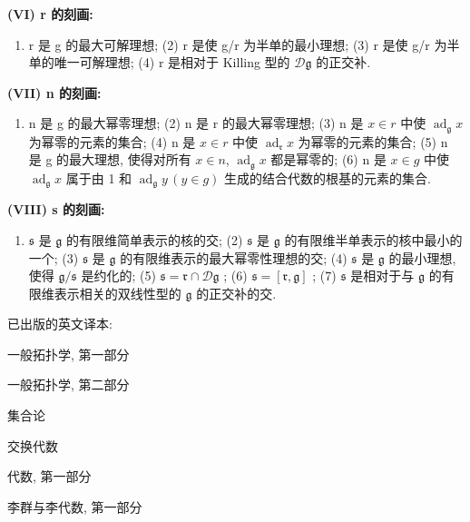 \textbf{(VI) r 的刻画:}

\begin{enumerate}
\def\labelenumi{(\arabic{enumi})}
\tightlist
\item
  r 是 g 的最大可解理想; (2) r 是使 g/r 为半单的最小理想; (3) r 是使 g/r 为半单的唯一可解理想; (4) r 是相对于 Killing 型的 \(\mathcal{D}\mathfrak{g}\) 的正交补.
\end{enumerate}

\textbf{(VII) n 的刻画:}

\begin{enumerate}
\def\labelenumi{(\arabic{enumi})}
\tightlist
\item
  n 是 g 的最大幂零理想; (2) n 是 r 的最大幂零理想; (3) n 是 \(x \in r\) 中使 \(\operatorname{ad}_{\mathfrak{g}} x\) 为幂零的元素的集合; (4) n 是 \(x \in r\) 中使 \(\operatorname{ad}_{\mathfrak{r}} x\) 为幂零的元素的集合; (5) n 是 g 的最大理想, 使得对所有 \(x \in n\), \(\operatorname{ad}_{\mathfrak{g}} x\) 都是幂零的; (6) n 是 \(x \in g\) 中使 \(\operatorname{ad}_{\mathfrak{g}} x\) 属于由 1 和 \(\operatorname{ad}_{\mathfrak{g}} y\,(y \in g)\) 生成的结合代数的根基的元素的集合.
\end{enumerate}

\textbf{(VIII) s 的刻画:}

\begin{enumerate}
\def\labelenumi{(\arabic{enumi})}
\tightlist
\item
  \(\mathfrak{s}\) 是 \(\mathfrak{g}\) 的有限维简单表示的核的交; (2) \(\mathfrak{s}\) 是 \(\mathfrak{g}\) 的有限维半单表示的核中最小的一个; (3) \(\mathfrak{s}\) 是 \(\mathfrak{g}\) 的有限维表示的最大幂零性理想的交; (4) \(\mathfrak{s}\) 是 \(\mathfrak{g}\) 的最小理想, 使得 \(\mathfrak{g} / \mathfrak{s}\) 是约化的; (5) \(\mathfrak{s} = \mathfrak{r} \cap \mathcal{D}\mathfrak{g}\) ; (6) \(\mathfrak{s} = [\mathfrak{r}, \mathfrak{g}]\) ; (7) \(\mathfrak{s}\) 是相对于与 \(\mathfrak{g}\) 的有限维表示相关的双线性型的 \(\mathfrak{g}\) 的正交补的交.
\end{enumerate}



已出版的英文译本:

一般拓扑学, 第一部分

一般拓扑学, 第二部分

集合论

交换代数

代数, 第一部分

李群与李代数, 第一部分

